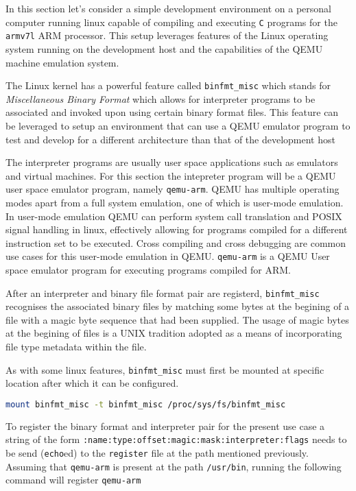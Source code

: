 In this section let's consider a simple development environment on a personal computer running linux capable of compiling and executing \texttt{C} programs for the \texttt{armv7l} ARM processor. This setup leverages features of the Linux operating system running on the development host and the capabilities of the QEMU machine emulation system.

The Linux kernel has a powerful feature called \texttt{binfmt\_misc} which stands for \textit{Miscellaneous Binary Format} which allows for interpreter programs to be associated and invoked upon using certain binary format files. This feature can be leveraged to setup an environment that can use a QEMU emulator program to test and develop for a different architecture than that of the development host

The interpreter programs are usually user space applications such as emulators and virtual machines. For this section the intepreter program will be a QEMU user space emulator program, namely \texttt{qemu-arm}. QEMU has multiple operating modes apart from a full system emulation, one of which is user-mode emulation. In user-mode emulation QEMU can perform system call translation and POSIX signal handling in linux, effectively allowing for programs compiled for a different instruction set to be executed. Cross compiling and cross debugging are common use cases for this user-mode emulation in QEMU. \texttt{qemu-arm} is a QEMU User space emulator program for executing programs compiled for ARM.

After an interpreter and binary file format pair are registerd, \texttt{binfmt\_misc} recognises the associated binary files by matching some bytes at the begining of a file with a magic byte sequence that had been supplied. The usage of magic bytes at the begining of files is a UNIX tradition adopted as a means of incorporating file type metadata within the file.

As with some linux features, \texttt{binfmt\_misc} must first be mounted at specific location after which it can be configured.

\begin{lstlisting}[language=Bash]
	mount binfmt_misc -t binfmt_misc /proc/sys/fs/binfmt_misc
\end{lstlisting}

To register the binary format and interpreter pair for the present use case a string of the form \texttt{:name:type:offset:magic:mask:interpreter:flags} needs to be send (\texttt{echo}ed) to the \texttt{register} file at the path mentioned previously. Assuming that \texttt{qemu-arm} is present at the path \texttt{/usr/bin}, running the following command will register \texttt{qemu-arm}

